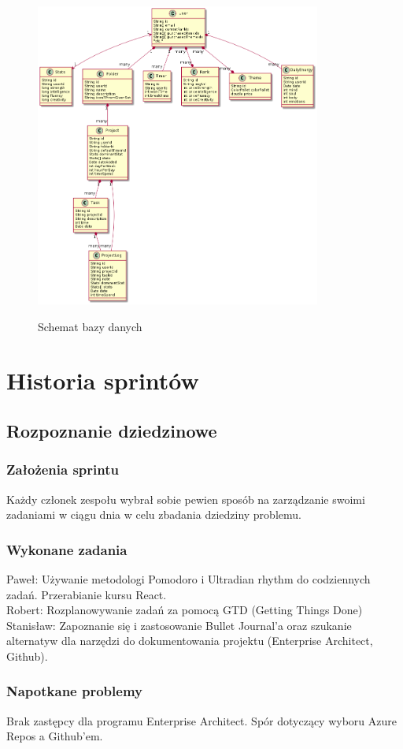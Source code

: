 \documentclass[a4paper,11pt]{report}
\begin{document}
\begin{figure}[h]
	\centering
	\includegraphics[width=\textwidth, height=10cm]{gamitude_database_model}\\
	\caption{Schemat bazy danych}
	\label{fig:db}
\end{figure}
\chapter {Historia sprintów}
\section {Rozpoznanie dziedzinowe}
\subsection {Założenia sprintu}
Każdy członek zespołu wybrał sobie pewien sposób na zarządzanie swoimi zadaniami w ciągu dnia w celu zbadania dziedziny problemu.
\subsection {Wykonane zadania}
Paweł: Używanie metodologi Pomodoro i Ultradian rhythm do codziennych zadań. Przerabianie kursu React.\\
Robert: Rozplanowywanie zadań za pomocą GTD (Getting Things Done)\\
Stanisław: Zapoznanie się i zastosowanie Bullet Journal'a oraz szukanie alternatyw dla narzędzi do dokumentowania projektu (Enterprise Architect, Github).\\
\subsection {Napotkane problemy}
Brak zastępcy dla programu Enterprise Architect. Spór dotyczący wyboru Azure Repos a Github'em.
\end{document}
